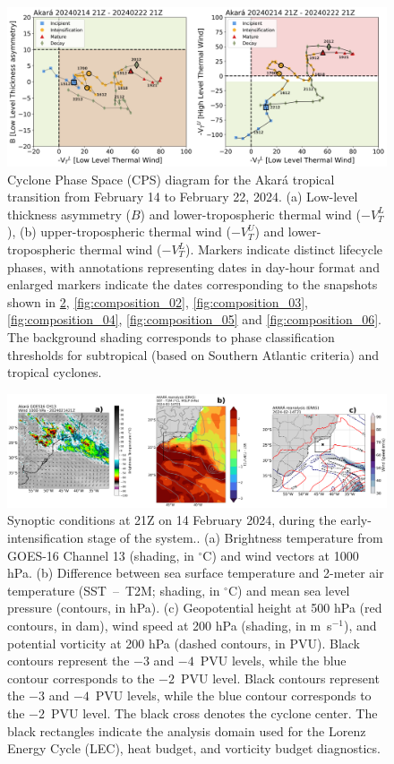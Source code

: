 \documentclass[pdflatex,sn-chicago]{sn-jnl}%
\theoremstyle{plain}
\theoremstyle{definition}
\theoremstyle{remark}
\theoremstyle{definition}
\begin{document}
\begin{figure}[h!]
\centering
\includegraphics[width=\textwidth]{cps_datas_danilo.png}
\caption{Cyclone Phase Space (CPS) diagram for the Akará tropical transition from February 14 to February 22, 2024. (a) Low-level thickness asymmetry (\(B\)) and lower-tropospheric thermal wind (\(-V_T^L\)), (b) upper-tropospheric thermal wind (\(-V_T^U\)) and lower-tropospheric thermal wind (\(-V_T^L\)). Markers indicate distinct lifecycle phases, with annotations representing dates in day-hour format and enlarged markers indicate the dates corresponding to the snapshots shown in \ref{fig:composition_01}, \ref{fig:composition_02}, \ref{fig:composition_03}, \ref{fig:composition_04}, \ref{fig:composition_05} and \ref{fig:composition_06}. The background shading corresponds to phase classification thresholds for subtropical (based on Southern Atlantic criteria) and tropical cyclones.}
\label{fig:cps}
\end{figure}


\begin{figure}[h!]
\centering
\includegraphics[width=\textwidth]{composition_01.png}
\caption{Synoptic conditions at 21Z on 14 February 2024, during the early-intensification stage of the system.. (a) Brightness temperature from GOES-16 Channel 13 (shading, in $^{\circ}$C) and wind vectors at 1000 hPa. (b) Difference between sea surface temperature and 2-meter air temperature (SST~--~T2M; shading, in $^{\circ}$C) and mean sea level pressure (contours, in hPa). (c) Geopotential height at 500 hPa (red contours, in dam), wind speed at 200 hPa (shading, in m~s$^{-1}$), and potential vorticity at 200 hPa (dashed contours, in PVU). Black contours represent the $-3$ and $-4$~PVU levels, while the blue contour corresponds to the $-2$~PVU level. Black contours represent the $-3$ and $-4$~PVU levels, while the blue contour corresponds to the $-2$~PVU level. The black cross denotes the cyclone center. The black rectangles indicate the analysis domain used for the Lorenz Energy Cycle (LEC), heat budget, and vorticity budget diagnostics.}
\label{fig:composition_01}
\end{figure}
\end{document}

